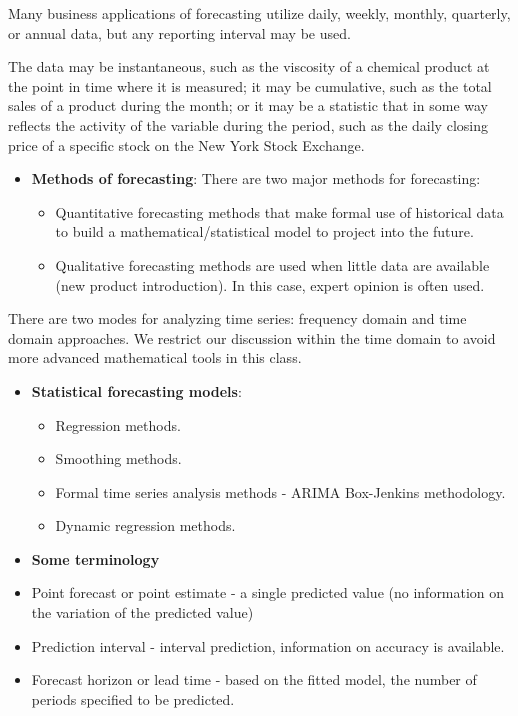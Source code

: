\documentclass[
]{book}
\begin{document}
Many business applications of forecasting utilize daily, weekly, monthly, quarterly, or annual data, but any reporting interval may be used.

The data may be instantaneous, such as the viscosity of a chemical product at the point in time where it is measured; it may be cumulative, such as the total sales of a product during the month; or it may be a statistic that in some way reflects the activity of the variable during the period, such as the daily closing price of a specific stock on the New York Stock Exchange.

\begin{itemize}
\item
  \textbf{Methods of forecasting}: There are two major methods for forecasting:

  \begin{itemize}
  \item
    Quantitative forecasting methods that make formal use of historical data to build a mathematical/statistical model to project into the future.
  \item
    Qualitative forecasting methods are used when little data are available (new product introduction). In this case, expert opinion is often used.
  \end{itemize}
\end{itemize}

There are two modes for analyzing time series: frequency domain and time domain approaches. We restrict our discussion within the time domain to avoid more advanced mathematical tools in this class.

\begin{itemize}
\item
  \textbf{Statistical forecasting models}:

  \begin{itemize}
  \item
    Regression methods.
  \item
    Smoothing methods.
  \item
    Formal time series analysis methods - ARIMA Box-Jenkins methodology.
  \item
    Dynamic regression methods.
  \end{itemize}
\item
  \textbf{Some terminology}
\item
  Point forecast or point estimate - a single predicted value (no information on the variation of the predicted value)
\item
  Prediction interval - interval prediction, information on accuracy is available.
\item
  Forecast horizon or lead time - based on the fitted model, the number of periods specified to be predicted.
\end{itemize}
\end{document}

